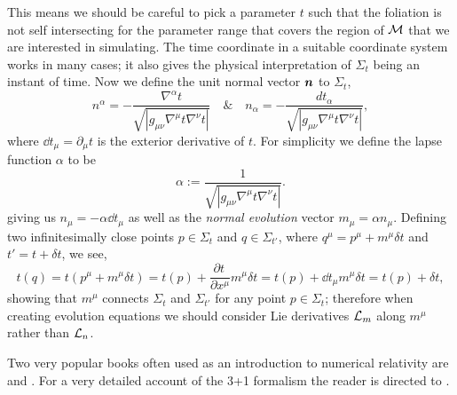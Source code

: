 This means we should be careful to pick a parameter $t$ such that the foliation is not self intersecting for the parameter range that covers the region of $\mathcal{M}$ that we are interested in simulating. The time coordinate in a suitable coordinate system works in many cases; it also gives the physical interpretation of $\Sigma_t$ being an instant of time. Now we define the unit normal vector $\boldsymbol{n}$ to $\Sigma_t$,
\begin{equation} n^\alpha = -\frac{\nabla^\alpha t}{\sqrt{|g_{\mu\nu}\nabla^\mu t \nabla^\nu t|}} \quad \& \quad  n_\alpha = -\frac{dt_\alpha}{\sqrt{|g_{\mu\nu}\nabla^\mu t \nabla^\nu t|}},\end{equation}
where $\dd t_\mu=\partial_\mu t$ is the exterior derivative of $t$.
For simplicity we define the lapse function $\alpha$ to be
\begin{equation}\alpha :=  \frac{1}{\sqrt{|g_{\mu\nu}\nabla^\mu t \nabla^\nu t|}}. \end{equation}
giving us $n_\mu = -\alpha \dd t_\mu$ as well as the {\it normal evolution} vector $m_\mu = \alpha n_\mu$. Defining two infinitesimally close points $p\in\Sigma_t$ and $q\in\Sigma_{t'}$, where $ q^\mu = p^\mu + m^\mu\delta t$ and $t' = t+ \delta t$, we see,
\begin{equation} t(q) = t(p^\mu +  m^\mu\delta t) = t(p) + \frac{\partial t^{\,}}{\partial x^\mu}m^\mu\delta t = t(p) + \dd t_\mu m^\mu \delta t =  t(p) + \delta t,\end{equation}
showing that $m^\mu$ connects $\Sigma_t$ and $\Sigma_{t'}$ for any point $p\in \Sigma_t$;
therefore when creating evolution equations we should consider Lie derivatives $\mathcal{L}_m$ along
$m^\mu$ rather than $\mathcal{L}_n$.

Two very popular books often used as an introduction to numerical relativity are
\cite{baumgarte_shapiro_2010} and \cite{alcubierre2008introduction}. For a very detailed
account of the 3+1 formalism the reader is directed to \cite{gourgoulhon20073+}.




